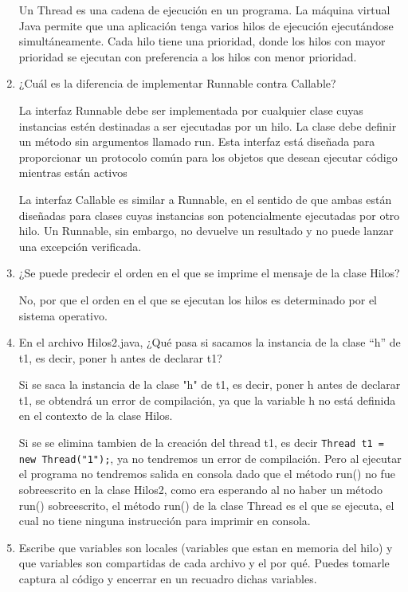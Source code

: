 \documentclass{article}
\begin{document}
\begin{enumerate}
    Un Thread es una cadena de ejecución en un programa. La máquina virtual Java permite que una aplicación tenga varios hilos de ejecución ejecutándose simultáneamente. Cada hilo tiene una prioridad, donde los hilos con mayor prioridad se ejecutan con preferencia a los hilos con menor prioridad. 
    
    \item ¿Cuál es la diferencia de implementar Runnable contra Callable?
    
    La interfaz Runnable debe ser implementada por cualquier clase cuyas instancias estén destinadas a ser ejecutadas por un hilo. La clase debe definir un método sin argumentos llamado run. Esta interfaz está diseñada para proporcionar un protocolo común para los objetos que desean ejecutar código mientras están activos

    La interfaz Callable es similar a Runnable, en el sentido de que ambas están diseñadas para clases cuyas instancias son potencialmente ejecutadas por otro hilo. Un Runnable, sin embargo, no devuelve un resultado y no puede lanzar una excepción verificada.

    \item ¿Se puede predecir el orden en el que se imprime el mensaje de la clase Hilos?
    
    No, por que el orden en el que se ejecutan los hilos es determinado por el sistema operativo.
    
    \item En el archivo Hilos2.java, ¿Qué pasa si sacamos la instancia de la clase “h” de t1, es decir, poner h antes de declarar t1?
    
    Si se saca la instancia de la clase "h" de t1, es decir, poner h antes de declarar t1, se obtendrá un error de compilación, ya que la variable h no está definida en el contexto de la clase Hilos.
    
    Si se se elimina tambien de la creación del thread t1, es decir  \texttt{Thread t1 = new Thread("1");}, ya no tendremos un error de compilación. 
    Pero al ejecutar el programa no tendremos salida en consola dado que el método run() no fue sobreescrito en la clase Hilos2, como era esperando al no haber un método run() sobreescrito, el método run() de la clase Thread es el que se ejecuta, el cual no tiene ninguna instrucción para imprimir en consola.

    \item Escribe que variables son locales (variables que estan en memoria del hilo) y que variables son compartidas de cada archivo y el por qué. Puedes tomarle captura al código y encerrar en un recuadro dichas variables.      
    

\end{enumerate}
\end{document}
